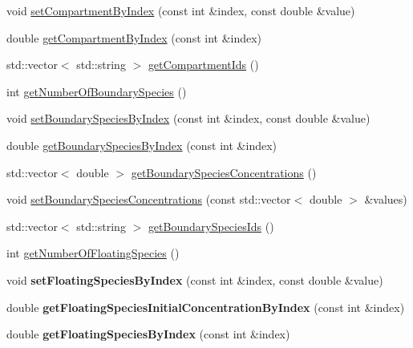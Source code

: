 \begin{DoxyCompactItemize}
\item 
void \hyperlink{classrr_1_1_road_runner_a01dbe5358bd652891be6209260523cb6}{set\-Compartment\-By\-Index} (const int \&index, const double \&value)
\item 
double \hyperlink{classrr_1_1_road_runner_a14b51ebe111fd7292dbca21a2749125b}{get\-Compartment\-By\-Index} (const int \&index)
\item 
std\-::vector$<$ std\-::string $>$ \hyperlink{classrr_1_1_road_runner_af5dfe0456563a2f364762ac9e839f273}{get\-Compartment\-Ids} ()
\item 
int \hyperlink{classrr_1_1_road_runner_a54a9d80927c998e0981a2deac0671758}{get\-Number\-Of\-Boundary\-Species} ()
\item 
void \hyperlink{classrr_1_1_road_runner_af8d2ff8ebf2c85f918cc2888ac68f479}{set\-Boundary\-Species\-By\-Index} (const int \&index, const double \&value)
\item 
double \hyperlink{classrr_1_1_road_runner_afc7498e1fe7098233c87f4427e74509b}{get\-Boundary\-Species\-By\-Index} (const int \&index)
\item 
std\-::vector$<$ double $>$ \hyperlink{classrr_1_1_road_runner_aa8b3a8ad7d52eb86a9a6b5970510e569}{get\-Boundary\-Species\-Concentrations} ()
\item 
void \hyperlink{classrr_1_1_road_runner_a42a995530149829e8deda1a18419a864}{set\-Boundary\-Species\-Concentrations} (const std\-::vector$<$ double $>$ \&values)
\item 
std\-::vector$<$ std\-::string $>$ \hyperlink{classrr_1_1_road_runner_afb363e6354cc06772219f3f59b591320}{get\-Boundary\-Species\-Ids} ()
\item 
int \hyperlink{classrr_1_1_road_runner_af2467ad14443e89ac9a1ed98481093c3}{get\-Number\-Of\-Floating\-Species} ()
\item 
\hypertarget{classrr_1_1_road_runner_ab06b478ffc51b1c0bad9926ae1840ab9}{void {\bfseries set\-Floating\-Species\-By\-Index} (const int \&index, const double \&value)}\label{classrr_1_1_road_runner_ab06b478ffc51b1c0bad9926ae1840ab9}

\item 
\hypertarget{classrr_1_1_road_runner_a842015aa1d5a024a0d4a96443cb3977e}{double {\bfseries get\-Floating\-Species\-Initial\-Concentration\-By\-Index} (const int \&index)}\label{classrr_1_1_road_runner_a842015aa1d5a024a0d4a96443cb3977e}

\item 
\hypertarget{classrr_1_1_road_runner_a6c15d6020db73f2cba5cc048360222cd}{double {\bfseries get\-Floating\-Species\-By\-Index} (const int \&index)}\label{classrr_1_1_road_runner_a6c15d6020db73f2cba5cc048360222cd}


\end{DoxyCompactItemize}
